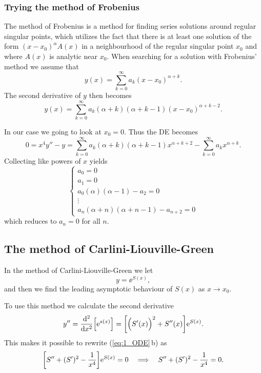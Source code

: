 \documentclass[11pt,letter, swedish, english
]{article}
\begin{document}
\subsubsection{Trying the method of Frobenius}
The method of Frobenius is a method for finding series solutions around
regular singular points, which utilizes the fact that there is 
at least one solution of the form $(x-x_0)^{\alpha}A(x)$ in a
neighbourhood of the regular singular point $x_0$ and where $A(x)$ is
analytic near $x_0$. When searching for a solution with Frobenius'
method we assume that
\begin{equation}
y(x)=\sum_{k=0}^\infty a_k (x-x_0)^{\alpha+k}.
\end{equation}
The second derivative of $y$ then becomes
\begin{equation}
y(x)=\sum_{k=0}^\infty a_k (\alpha+k)(\alpha+k-1) (x-x_0)^{\alpha+k-2}.
\end{equation}

In our case we going to look at $x_0=0$. Thus the DE becomes
\begin{equation}
0=x^4y''-y=
\sum_{k=0}^\infty a_k (\alpha+k)(\alpha+k-1) x^{\alpha+k+2}
-\sum_{k=0}^\infty a_k x^{\alpha+k}.
\end{equation}
Collecting like powers of $x$ yields
\begin{equation}
\begin{cases}
a_0=0\\
a_1=0\\
a_0(\alpha)(\alpha-1)-a_2=0\\
\vdots\\
a_n(\alpha+n)(\alpha+n-1)-a_{n+2}=0
\end{cases}
\end{equation}
which reduces to $a_n=0$ for all $n$.


\subsection{The method of Carlini-Liouville-Green}
In the method of Carlini-Liouville-Green we let
\begin{equation}
y=\ee^{S(x)},
\end{equation}
and then we find the leading asymptotic behaviour of $S(x)$ as
$x\to x_0$. 

To use this method we calculate the second derivative
\begin{equation}
y''=\dv[2]{x}\qty[\mathrm{e}^{s(x)}]
=\qty[\Big(S'(x)\Big)^2 + S''(x)]\mathrm{e}^{S(x)}.
\end{equation}
This makes it possible to rewrite (\ref{eq:1_ODE}\,b) as
\begin{equation}\label{eq:1_DE_S}
\qty[S'' + (S')^2 -\frac{1}{x^4}]\mathrm{e}^{S(x)}=0
\quad\Longrightarrow\quad
S'' + (S')^2 -\frac{1}{x^4}=0. 
\end{equation}
\end{document}
